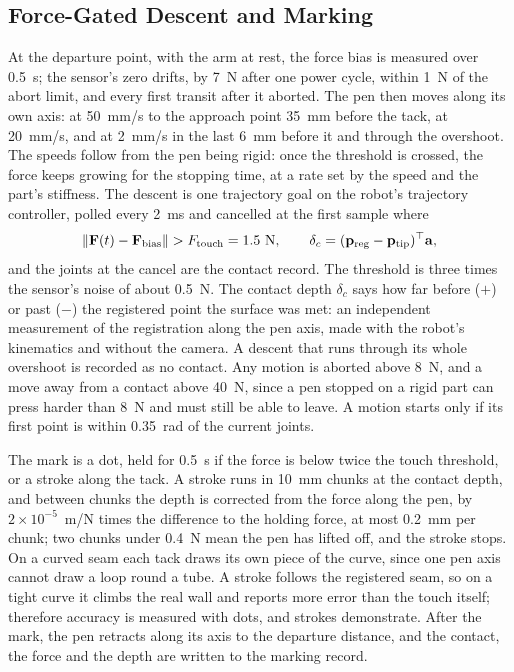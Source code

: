 \subsection{Force-Gated Descent and Marking}
\label{sec:mc_marking}
At the departure point, with the arm at rest, the force bias is measured over 0.5~s; the sensor's zero
drifts, by 7~N after one power cycle, within 1~N of the abort limit, and every first transit after it
aborted. The pen then moves along
its own axis: at 50~mm/s to the approach point 35~mm before the tack, at 20~mm/s, and at 2~mm/s in the
last 6~mm before it and through the overshoot. The speeds follow from the pen being rigid: once the
threshold is crossed, the force keeps growing for the stopping time, at a rate set by the speed and the
part's stiffness. The descent is one trajectory goal on the robot's trajectory controller, polled every
2~ms and cancelled at the first sample where
\begin{equation}
\left\lVert\mathbf{F}(t)-\mathbf{F}_{\mathrm{bias}}\right\rVert > F_{\mathrm{touch}} = 1.5\ \mathrm{N},
\qquad
\delta_c = (\mathbf{p}_{\mathrm{reg}}-\mathbf{p}_{\mathrm{tip}})^{\top}\mathbf{a},
\label{eq:touch}
\end{equation}
and the joints at the cancel are the contact record. The threshold is three times the sensor's noise of
about 0.5~N. The contact depth $\delta_c$ says how far before ($+$) or past ($-$) the registered point the
surface was met: an independent measurement of the registration along the pen axis, made with the
robot's kinematics and without the camera. A descent that runs through its whole overshoot is recorded
as no contact. Any motion is aborted above 8~N, and a move away from a contact above 40~N, since a pen
stopped on a rigid part can press harder than 8~N and must still be able to leave. A motion starts only
if its first point is within 0.35~rad of the current joints.

The mark is a dot, held for 0.5~s if the force is below twice the touch threshold, or a stroke along
the tack. A stroke runs in
10~mm chunks at the contact depth, and between chunks the depth is corrected from the force along the pen,
by $2\times10^{-5}$~m/N times the difference to the holding force, at most 0.2~mm per chunk; two chunks
under 0.4~N mean the pen has lifted off, and the stroke stops. On a curved seam each tack draws its own
piece of the curve, since one pen axis cannot draw a loop round a tube. A stroke follows the registered
seam, so on a tight curve it climbs the real wall and reports more error than the touch itself;
therefore accuracy is measured with dots, and strokes demonstrate. After the mark, the pen retracts along
its axis to the departure distance, and the contact, the force and the depth are written to the marking
record.

